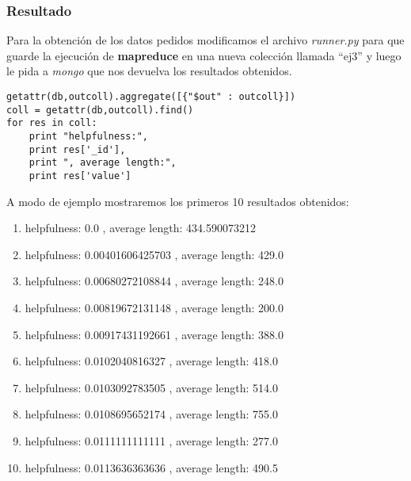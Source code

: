 \subsubsection{Resultado}

Para la obtención de los datos pedidos modificamos el archivo \textit{runner.py} para que guarde la ejecución de \textbf{mapreduce} en una nueva colección llamada ``ej3'' y luego le pida a \textit{mongo} que nos devuelva los resultados obtenidos.\\

\begin{lstlisting}[frame=leftline]
getattr(db,outcoll).aggregate([{"$out" : outcoll}])
coll = getattr(db,outcoll).find()
for res in coll:
	print "helpfulness:",
	print res['_id'],
	print ", average length:",
	print res['value'] 
\end{lstlisting}

A modo de ejemplo mostraremos los primeros 10 resultados obtenidos: 

\begin{enumerate}
\item helpfulness: 0.0 , average length: 434.590073212
\item helpfulness: 0.00401606425703 , average length: 429.0
\item helpfulness: 0.00680272108844 , average length: 248.0
\item helpfulness: 0.00819672131148 , average length: 200.0
\item helpfulness: 0.00917431192661 , average length: 388.0
\item helpfulness: 0.0102040816327 , average length: 418.0
\item helpfulness: 0.0103092783505 , average length: 514.0
\item helpfulness: 0.0108695652174 , average length: 755.0
\item helpfulness: 0.0111111111111 , average length: 277.0
\item helpfulness: 0.0113636363636 , average length: 490.5
\end{enumerate}

